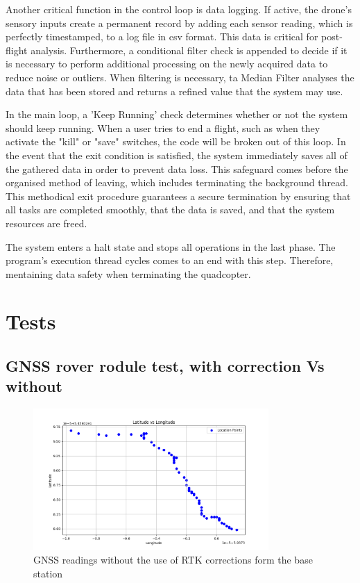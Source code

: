 \documentclass{report}
\begin{document}
Another critical function in the control loop is data logging. If active, the
drone's sensory inputs create a permanent record by adding each sensor reading,
which is perfectly timestamped, to a log file in csv format. This data is
critical for post-flight analysis. Furthermore, a conditional filter check is
appended to decide if it is necessary to perform additional processing on the
newly acquired data to reduce noise or outliers. When filtering is necessary, ta
Median Filter analyses the data that has been stored and returns a refined value
that the system may use.

In the main loop, a 'Keep Running' check determines whether or not the system
should keep running. When a user tries to end a flight, such as when they
activate the "kill" or "save" switches, the code will be broken out of this
loop. In the event that the exit condition is satisfied, the system immediately
saves all of the gathered data in order to prevent data loss. This safeguard
comes before the organised method of leaving, which includes terminating the
background thread. This methodical exit procedure guarantees a secure
termination by ensuring that all tasks are completed smoothly, that the data is
saved, and that the system resources are freed.

The system enters a halt state and stops all operations in the last phase. The
program’s execution thread cycles comes to an end with this step. Therefore,
mentaining data safety when terminating the quadcopter.


\chapter{Tests}\label{tests}

\section{GNSS rover rodule test, with correction Vs
without}\label{GNSS_rover_module}
\begin{figure}[H]
  \centering
  \includegraphics[width=0.8\textwidth]{Pictures/GNSS_no_RTK.png}
  \caption{GNSS readings without the use of RTK corrections form the base station}
  \label{fig:GNSS_no_RTK}
\end{figure}
\end{document}
